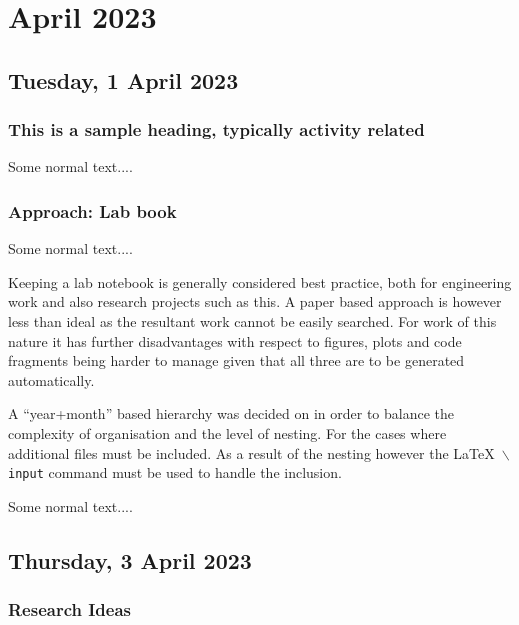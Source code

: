 \chapter[2023 April]{April 2023}

\section[2023/04/02]{Tuesday, 1 April 2023}
\label{sec:somewhere}

\subsection{This is a sample heading, typically activity related}

Some normal text....

\subsection{Approach: Lab book}

Some normal text....

\begin{slantnote}
  Keeping a lab notebook is generally considered best practice, both for
  engineering work and also research projects such as this. A paper based
  approach is however less than ideal as the resultant work cannot be
  easily searched. For work of this nature it has further disadvantages
  with respect to figures, plots and code fragments being harder to manage
  given that all three are to be generated automatically.

  A ``year+month'' based hierarchy was decided on in order to balance the
  complexity of organisation and the level of nesting. For the cases where
  additional files must be included. As a result of the nesting however the
  \LaTeX\ \texttt{$\backslash$input} command must be used to handle the
  inclusion.
\end{slantnote}

Some normal text....

\pendsign

\section[2023/04/04]{Thursday, 3 April 2023}

\subsection{Research Ideas}


